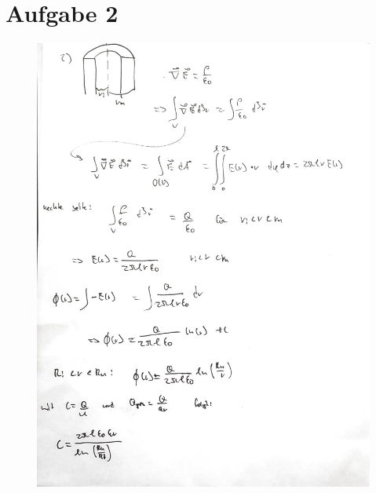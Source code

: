 \documentclass[11pt a4paper]{article}
\begin{document}
\section*{Aufgabe 2}
\begin{figure}[H]
	\centering
	\includegraphics[width=15cm]{roman/2_1_cleaned.jpg}
\end{figure}
\newpage
\end{document}
